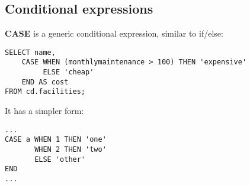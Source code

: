 %

\color{black}
\subsection{Conditional expressions}
\textbf{CASE} is a generic conditional expression, similar to if/else:
\begin{verbatim}
SELECT name,
    CASE WHEN (monthlymaintenance > 100) THEN 'expensive'
         ELSE 'cheap'
    END AS cost
FROM cd.facilities;
\end{verbatim}
It has a simpler form:
\begin{verbatim}
...
CASE a WHEN 1 THEN 'one'
       WHEN 2 THEN 'two'
       ELSE 'other'
END
...
\end{verbatim}

%